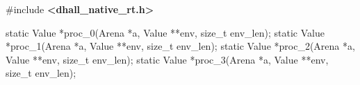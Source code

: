 \documentclass[]{article}
\newenvironment{Shaded}{}{}
\newcommand{\DataTypeTok}[1]{\textcolor[rgb]{0.56,0.13,0.00}{#1}}
\newcommand{\ImportTok}[1]{\textcolor[rgb]{0.00,0.50,0.00}{\textbf{#1}}}
\newcommand{\NormalTok}[1]{#1}
\newcommand{\OperatorTok}[1]{\textcolor[rgb]{0.40,0.40,0.40}{#1}}
\newcommand{\PreprocessorTok}[1]{\textcolor[rgb]{0.74,0.48,0.00}{#1}}
\begin{document}
\begin{Shaded}
\begin{Highlighting}[]
\PreprocessorTok{\#include }\ImportTok{\textless{}dhall\_native\_rt.h\textgreater{}}

\DataTypeTok{static}\NormalTok{ Value }\OperatorTok{*}\NormalTok{proc\_0}\OperatorTok{(}\NormalTok{Arena }\OperatorTok{*}\NormalTok{a}\OperatorTok{,}\NormalTok{ Value }\OperatorTok{**}\NormalTok{env}\OperatorTok{,} \DataTypeTok{size\_t}\NormalTok{ env\_len}\OperatorTok{);}
\DataTypeTok{static}\NormalTok{ Value }\OperatorTok{*}\NormalTok{proc\_1}\OperatorTok{(}\NormalTok{Arena }\OperatorTok{*}\NormalTok{a}\OperatorTok{,}\NormalTok{ Value }\OperatorTok{**}\NormalTok{env}\OperatorTok{,} \DataTypeTok{size\_t}\NormalTok{ env\_len}\OperatorTok{);}
\DataTypeTok{static}\NormalTok{ Value }\OperatorTok{*}\NormalTok{proc\_2}\OperatorTok{(}\NormalTok{Arena }\OperatorTok{*}\NormalTok{a}\OperatorTok{,}\NormalTok{ Value }\OperatorTok{**}\NormalTok{env}\OperatorTok{,} \DataTypeTok{size\_t}\NormalTok{ env\_len}\OperatorTok{);}
\DataTypeTok{static}\NormalTok{ Value }\OperatorTok{*}\NormalTok{proc\_3}\OperatorTok{(}\NormalTok{Arena }\OperatorTok{*}\NormalTok{a}\OperatorTok{,}\NormalTok{ Value }\OperatorTok{**}\NormalTok{env}\OperatorTok{,} \DataTypeTok{size\_t}\NormalTok{ env\_len}\OperatorTok{);}


\end{Highlighting}
\end{Shaded}
\end{document}
